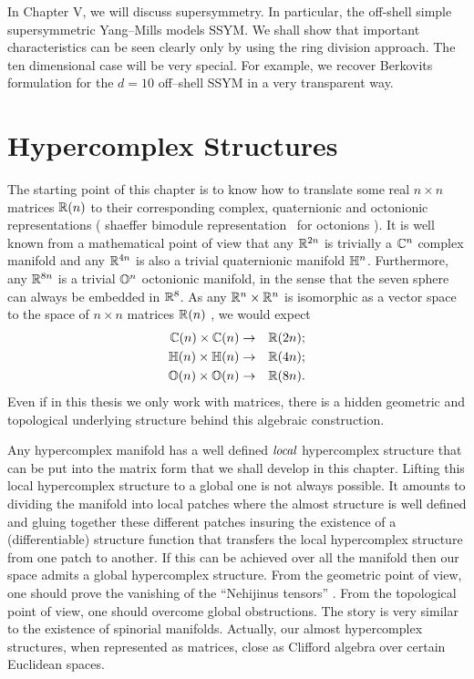 \documentclass[a4paper,12pt]{book}
\begin{document}
In Chapter V, we will discuss supersymmetry. In particular, the off-shell
simple supersymmetric Yang--Mills models SSYM. We shall show that important
characteristics can be seen clearly only by using the ring division
approach. The ten dimensional case will be very special. For example, we
recover Berkovits formulation for the $d=10$ off--shell SSYM in a very
transparent way.

\chapter{Hypercomplex Structures}

The starting point of this chapter is to know how to translate some real $%
n\times n$ matrices $\Bbb{R}(n)$ to their corresponding complex,
quaternionic and octonionic representations ( shaeffer bimodule
representation \ for octonions \cite{shaeffer}). It is well known from a
mathematical point of view that any $\Bbb{R}^{2n}$ is trivially a $\Bbb{C}%
^{n}$ complex manifold and any $\Bbb{R}^{4n}$ is also a trivial quaternionic
manifold $\Bbb{H}^{n}$. Furthermore, any $\Bbb{R}^{8n}$ is a trivial $\Bbb{O}%
^{n}$ octonionic manifold, in the sense that the seven sphere can always be
embedded in $\Bbb{R}^{8}$. As any $\Bbb{R}^{n}\times \Bbb{R}^{n}$ is
isomorphic as a vector space to the space of $n\times n$ matrices $\Bbb{R}%
(n) $ \cite{gilmore}, we would expect 
\begin{eqnarray}
\Bbb{C}(n)\times \Bbb{C}(n) &\rightarrow &\Bbb{R}(2n);  \label{cl0} \\
\Bbb{H}(n)\times \Bbb{H}(n) &\rightarrow &\Bbb{R}(4n);  \label{cl1} \\
\Bbb{O}(n)\times \Bbb{O}(n) &\rightarrow &\Bbb{R}(8n).  \label{cl2}
\end{eqnarray}
Even if in this thesis we only work with matrices, there is a hidden
geometric and topological underlying structure behind this algebraic
construction.

Any hypercomplex manifold has a well defined $\emph{local}$ hypercomplex
structure that can be put into the matrix form that we shall develop in this
chapter. Lifting this local hypercomplex structure to a global one is not
always possible. It amounts to dividing the manifold into local patches
where the almost structure is well defined and gluing together these
different patches insuring the existence of a (differentiable) structure
function that transfers the local hypercomplex structure from one patch to
another. If this can be achieved over all the manifold then our space admits
a global hypercomplex structure. From the geometric point of view, one
should prove the vanishing of the ``Nehijinus tensors'' \cite{yano}\cite
{marcha}. From the topological point of view, one should overcome global
obstructions. The story is very similar to the existence of spinorial
manifolds. Actually, our almost hypercomplex structures, when represented as
matrices, close as Clifford algebra over certain Euclidean spaces.
\end{document}
